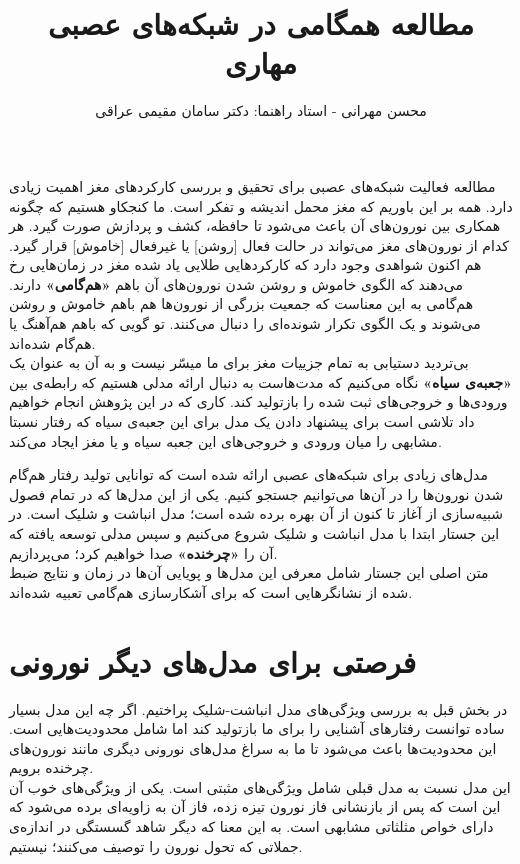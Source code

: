 \documentclass[12pt,onecolumn,a4paper]{book}
\begin{document}
\title{مطالعه همگامی در شبکه‌های عصبی مهاری} 
\author{محسن مهرانی - استاد راهنما: دکتر سامان مقیمی عراقی}
\date{}
\maketitle
\tableofcontents
\newpage
{}
مطالعه فعالیت شبکه‌های عصبی برای تحقیق و بررسی کارکردهای مغز اهمیت زیادی دارد. همه بر این باوریم که مغز محمل اندیشه و تفکر است. ما کنجکاو هستیم که چگونه همکاری بین نورون‌های آن باعث می‌شود تا حافظه، کشف و پردازش صورت گیرد. هر کدام از نورون‌های مغز می‌تواند در حالت فعال [روشن] یا غیرفعال [خاموش] قرار گیرد. هم اکنون شواهدی وجود دارد که کارکردهایی طلایی یاد شده مغز در زمان‌هایی رخ می‌دهند که الگوی خاموش و روشن شدن نورون‌های آن باهم \textbf{«هم‌گامی»} دارند. هم‌گامی به این معناست که جمعیت بزرگی از نورون‌ها هم باهم خاموش و روشن می‌شوند و یک الگوی تکرار شونده‌ای را دنبال می‌کنند. تو گویی که باهم هم‌آهنگ یا هم‌گام شده‌اند.\\

بی‌تردید دستیابی به تمام جزییات مغز برای ما میسّر نیست و به آن به عنوان یک \textbf{«جعبه‌ی سیاه»} نگاه می‌کنیم که مدت‌هاست به دنبال ارائه مدلی هستیم که رابطه‌ی بین ورودی‌ها و خروجی‌های ثبت شده را بازتولید کند. کاری که در این پژوهش انجام خواهیم داد تلاشی است برای پیشنهاد دادن یک مدل برای این جعبه‌ی سیاه که رفتار نسبتا مشابهی را میان ورودی و خروجی‌های این جعبه سیاه و یا مغز ایجاد می‌کند.

مدل‌های زیادی برای شبکه‌های عصبی ارائه شده است که توانایی تولید رفتار هم‌گام شدن نورون‌ها را در آن‌ها می‌توانیم جستجو کنیم. یکی از این مدل‌ها که در تمام فصول شبیه‌سازی از آغاز تا کنون از آن بهره برده شده است؛ مدل انباشت و شلیک است\cite{PhysRevLett.105.158104}. در این جستار ابتدا با مدل انباشت و شلیک شروع می‌کنیم و سپس مدلی توسعه یافته که آن را \textbf{«چرخنده»} صدا خواهیم کرد؛ می‌پردازیم.\\
متن اصلی این جستار شامل معرفی این مدل‌ها و پویایی آن‌ها در زمان و نتایج ضبط شده از نشانگرهایی است که برای آشکارسازی هم‌گامی تعبیه شده‌اند.

%
%
\section*{فرصتی برای مدل‌های دیگر نورونی}
در بخش قبل به بررسی ویژگی‌های مدل انباشت‌-شلیک پراختیم. اگر چه این مدل بسیار ساده توانست رفتارهای آشنایی را برای ما بازتولید کند اما شامل محدودیت‌هایی است. این محدودیت‌ها باعث می‌شود تا ما به سراغ مدل‌های نورونی دیگری مانند نورون‌های چرخنده برویم.\\
این مدل نسبت به مدل قبلی شامل ویژگی‌های مثبتی است. یکی از ویژگی‌های خوب آن این است که پس از بازنشانی فاز نورون تیزه زده، فاز آن به زاویه‌ای برده می‌شود که دارای خواص مثلثاتی مشابهی است. به این معنا که دیگر شاهد گسستگی در اندازه‌ی جملاتی که تحول نورون را توصیف می‌کنند؛ نیستیم.\\
%
%



\appendix
%

\newpage


\end{document}
